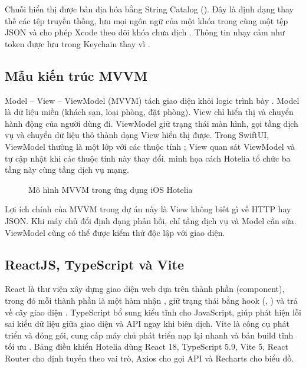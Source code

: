Chuỗi hiển thị được bản địa hóa bằng String Catalog (). Đây là định dạng thay thế các tệp  truyền thống, lưu mọi ngôn ngữ của một khóa trong cùng một tệp JSON và cho phép Xcode theo dõi khóa chưa dịch \cite{stringcatalog}. Thông tin nhạy cảm như token được lưu trong Keychain thay vì  \cite{keychain}.

\subsection{Mẫu kiến trúc MVVM}

Model -- View -- ViewModel (MVVM) tách giao diện khỏi logic trình bày \cite{gossman2005}. Model là dữ liệu miền (khách sạn, loại phòng, đặt phòng). View chỉ hiển thị và chuyển hành động của người dùng đi. ViewModel giữ trạng thái màn hình, gọi tầng dịch vụ và chuyển dữ liệu thô thành dạng View hiển thị được. Trong SwiftUI, ViewModel thường là một lớp  với các thuộc tính ; View quan sát ViewModel và tự cập nhật khi các thuộc tính này thay đổi.  minh họa cách Hotelia tổ chức ba tầng này cùng tầng dịch vụ mạng.

\begin{figure}[H]
\centering
{}
\caption{Mô hình MVVM trong ứng dụng iOS Hotelia}\label{fig:mvvm}
\end{figure}

Lợi ích chính của MVVM trong dự án này là View không biết gì về HTTP hay JSON. Khi máy chủ đổi định dạng phản hồi, chỉ tầng dịch vụ và Model cần sửa. ViewModel cũng có thể được kiểm thử độc lập với giao diện.

\subsection{ReactJS, TypeScript và Vite}

React là thư viện xây dựng giao diện web dựa trên thành phần (component), trong đó mỗi thành phần là một hàm nhận , giữ trạng thái bằng hook (, ) và trả về cây giao diện \cite{react}. TypeScript bổ sung kiểu tĩnh cho JavaScript, giúp phát hiện lỗi sai kiểu dữ liệu giữa giao diện và API ngay khi biên dịch. Vite là công cụ phát triển và đóng gói, cung cấp máy chủ phát triển nạp lại nhanh và bản build tĩnh tối ưu \cite{vite}. Bảng điều khiển Hotelia dùng React 18, TypeScript 5.9, Vite 5, React Router cho định tuyến theo vai trò, Axios cho gọi API và Recharts cho biểu đồ.


